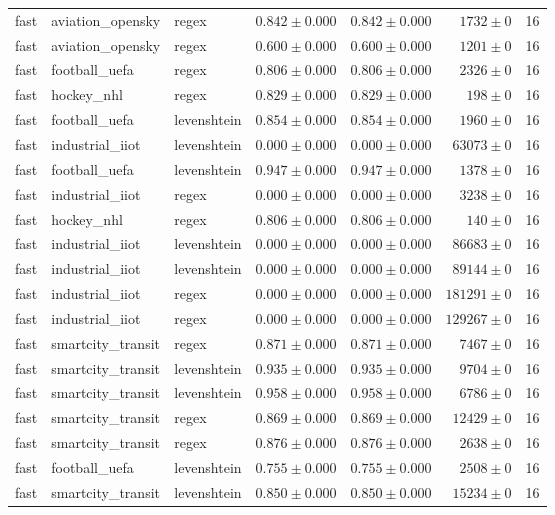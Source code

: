 \begin{table}[htbp]
\begin{tabular}{l l l r r r r}
fast & aviation\_opensky & regex & $0.842\pm0.000$ & $0.842\pm0.000$ & $1732\pm0$ & 16 \\
fast & aviation\_opensky & regex & $0.600\pm0.000$ & $0.600\pm0.000$ & $1201\pm0$ & 16 \\
fast & football\_uefa & regex & $0.806\pm0.000$ & $0.806\pm0.000$ & $2326\pm0$ & 16 \\
fast & hockey\_nhl & regex & $0.829\pm0.000$ & $0.829\pm0.000$ & $198\pm0$ & 16 \\
fast & football\_uefa & levenshtein & $0.854\pm0.000$ & $0.854\pm0.000$ & $1960\pm0$ & 16 \\
fast & industrial\_iiot & levenshtein & $0.000\pm0.000$ & $0.000\pm0.000$ & $63073\pm0$ & 16 \\
fast & football\_uefa & levenshtein & $0.947\pm0.000$ & $0.947\pm0.000$ & $1378\pm0$ & 16 \\
fast & industrial\_iiot & regex & $0.000\pm0.000$ & $0.000\pm0.000$ & $3238\pm0$ & 16 \\
fast & hockey\_nhl & regex & $0.806\pm0.000$ & $0.806\pm0.000$ & $140\pm0$ & 16 \\
fast & industrial\_iiot & levenshtein & $0.000\pm0.000$ & $0.000\pm0.000$ & $86683\pm0$ & 16 \\
fast & industrial\_iiot & levenshtein & $0.000\pm0.000$ & $0.000\pm0.000$ & $89144\pm0$ & 16 \\
fast & industrial\_iiot & regex & $0.000\pm0.000$ & $0.000\pm0.000$ & $181291\pm0$ & 16 \\
fast & industrial\_iiot & regex & $0.000\pm0.000$ & $0.000\pm0.000$ & $129267\pm0$ & 16 \\
fast & smartcity\_transit & regex & $0.871\pm0.000$ & $0.871\pm0.000$ & $7467\pm0$ & 16 \\
fast & smartcity\_transit & levenshtein & $0.935\pm0.000$ & $0.935\pm0.000$ & $9704\pm0$ & 16 \\
fast & smartcity\_transit & levenshtein & $0.958\pm0.000$ & $0.958\pm0.000$ & $6786\pm0$ & 16 \\
fast & smartcity\_transit & regex & $0.869\pm0.000$ & $0.869\pm0.000$ & $12429\pm0$ & 16 \\
fast & smartcity\_transit & regex & $0.876\pm0.000$ & $0.876\pm0.000$ & $2638\pm0$ & 16 \\
fast & football\_uefa & levenshtein & $0.755\pm0.000$ & $0.755\pm0.000$ & $2508\pm0$ & 16 \\
fast & smartcity\_transit & levenshtein & $0.850\pm0.000$ & $0.850\pm0.000$ & $15234\pm0$ & 16 \\

\end{tabular}
\end{table}
